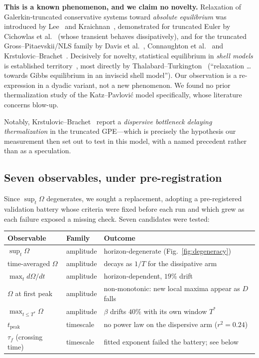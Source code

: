 \documentclass[11pt,a4paper]{article}
\theoremstyle{definition}
\theoremstyle{remark}
\begin{document}
\begin{keybox}
\textbf{This is a known phenomenon, and we claim no novelty.} Relaxation of
Galerkin-truncated conservative systems toward \emph{absolute equilibrium} was introduced
by Lee~\cite{Lee1952} and Kraichnan~\cite{Kraichnan1973}, demonstrated for truncated Euler
by Cichowlas et al.~\cite{Cichowlas2005} (whose transient behaves dissipatively), and for
the truncated Gross--Pitaevskii/NLS family by Davis et al.~\cite{Davis2001},
Connaughton et al.~\cite{Connaughton2005} and Krstulovic--Brachet~\cite{Krstulovic2011}.
Decisively for novelty, statistical equilibrium in \emph{shell models} is established
territory~\cite{Aurell1994,Ditlevsen1996,TomRay2017}, most directly by
Thalabard--Turkington~\cite{Thalabard2016} (``relaxation \dots{} towards Gibbs equilibrium
in an inviscid shell model''). Our observation is a re-expression in a dyadic variant, not
a new phenomenon. We found no prior thermalization study of the Katz--Pavlovi\'c model
specifically, whose literature concerns blow-up.
\end{keybox}

Notably, Krstulovic--Brachet~\cite{Krstulovic2011} report a \emph{dispersive bottleneck
delaying thermalization} in the truncated GPE---which is precisely the hypothesis our
measurement then set out to test in this model, with a named precedent rather than as a
speculation.

\subsection{Seven observables, under pre-registration}

Since $\sup_t\Omega$ degenerates, we sought a replacement, adopting a pre-registered
validation battery whose criteria were fixed before each run and which grew as each
failure exposed a missing check. Seven candidates were tested:

\begin{center}
\small
\begin{tabular}{@{}llp{7.6cm}@{}}
\toprule
Observable & Family & Outcome \\
\midrule
$\sup_t\Omega$ & amplitude & horizon-degenerate (Fig.~\ref{fig:degeneracy}) \\
time-averaged $\Omega$ & amplitude & decays as $1/T$ for the dissipative arm \\
$\max_t d\Omega/dt$ & amplitude & horizon-dependent, $19\%$ drift \\
$\Omega$ at first peak & amplitude & non-monotonic: new local maxima appear as $D$ falls \\
$\max_{t\le T^*}\Omega$ & amplitude & $\beta$ drifts $40\%$ with its own window $T^*$ \\
$t_{\text{peak}}$ & timescale & no power law on the dispersive arm ($r^2=0.24$) \\
$\tau_f$ (crossing time) & timescale & fitted exponent failed the battery; see below \\
\bottomrule
\end{tabular}
\end{center}
\end{document}
